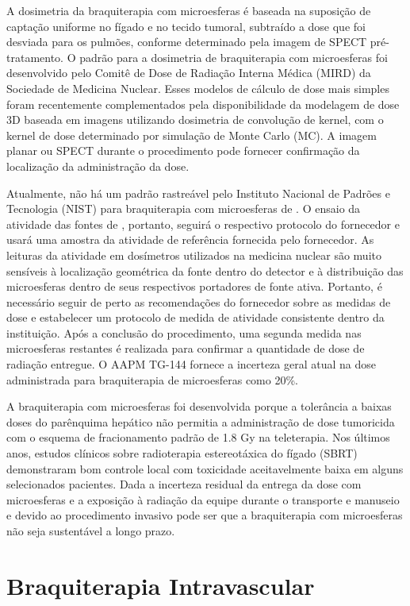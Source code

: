 \documentclass[11pt,a4paper]{article}
\begin{document}
    A dosimetria da braquiterapia com microesferas é baseada na suposição de captação uniforme no fígado e no tecido tumoral, subtraído a dose que foi desviada para os pulmões, conforme determinado pela imagem de SPECT pré-tratamento. O padrão para a dosimetria de braquiterapia com microesferas foi desenvolvido pelo Comitê de Dose de Radiação Interna Médica (MIRD) da Sociedade de Medicina Nuclear. Esses modelos de cálculo de dose mais simples foram recentemente complementados pela disponibilidade da modelagem de dose 3D baseada em imagens utilizando dosimetria de convolução de kernel, com o kernel de dose determinado por simulação de Monte Carlo (MC). A imagem planar ou SPECT durante o procedimento pode fornecer confirmação da localização da administração da dose.

    Atualmente, não há um padrão rastreável pelo Instituto Nacional de Padrões e Tecnologia (NIST) para braquiterapia com microesferas de . O ensaio da atividade das fontes de , portanto, seguirá o respectivo protocolo do fornecedor e usará uma amostra da atividade de referência fornecida pelo fornecedor. As leituras da atividade em dosímetros utilizados na medicina nuclear são muito sensíveis à localização geométrica da fonte dentro do detector e à distribuição das microesferas dentro de seus respectivos portadores de fonte ativa. Portanto, é necessário seguir de perto as recomendações do fornecedor sobre as medidas de dose e estabelecer um protocolo de medida de atividade consistente dentro da instituição. Após a conclusão do procedimento, uma segunda medida nas microesferas restantes é realizada para confirmar a quantidade de dose de radiação entregue. O AAPM TG-144 fornece a incerteza geral atual na dose administrada para braquiterapia de microesferas  como 20\%.

    A braquiterapia com microesferas foi desenvolvida porque a tolerância a baixas doses do parênquima hepático não permitia a administração de dose tumoricida com o esquema de fracionamento padrão de 1.8 Gy na teleterapia. Nos últimos anos, estudos clínicos sobre radioterapia estereotáxica do fígado (SBRT) demonstraram bom controle local com toxicidade aceitavelmente baixa em alguns selecionados pacientes. Dada a incerteza residual da entrega da dose com microesferas e a exposição à radiação da equipe durante o transporte e manuseio e devido ao procedimento invasivo pode ser que a braquiterapia com microesferas não seja sustentável a longo prazo.

\section{Braquiterapia Intravascular}
\end{document}

